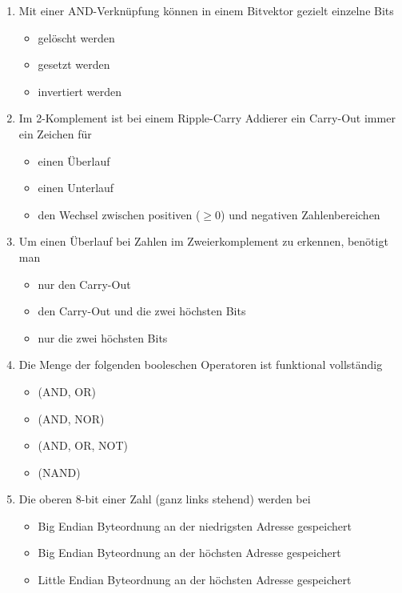 \documentclass{exercisesheet}
\begin{document}
\begin{enumerate}
\begin{itemize}
        \end{itemize}
      \item Mit einer AND-Verknüpfung können in einem Bitvektor gezielt einzelne Bits
        \begin{itemize}
          \item gelöscht werden \checkmark
          \item gesetzt werden
          \item invertiert werden
        \end{itemize}
      \item Im 2-Komplement ist bei einem Ripple-Carry Addierer ein Carry-Out immer ein Zeichen für
        \begin{itemize}
          \item einen Überlauf \checkmark
          \item einen Unterlauf
          \item den Wechsel zwischen positiven ($\geq 0$) und negativen Zahlenbereichen
        \end{itemize}
      \item Um einen Überlauf bei Zahlen im Zweierkomplement zu erkennen, benötigt man
        \begin{itemize}
          \item nur den Carry-Out
          \item den Carry-Out und die zwei höchsten Bits \checkmark
          \item nur die zwei höchsten Bits
        \end{itemize}
      \item Die Menge der folgenden booleschen Operatoren ist funktional vollständig
        \begin{itemize}
          \item (AND, OR) \checkmark
          \item (AND, NOR) \checkmark
          \item (AND, OR, NOT) \checkmark
          \item (NAND)
        \end{itemize}
      \item Die oberen 8-bit einer Zahl (ganz links stehend) werden bei
        \begin{itemize}
          \item Big Endian Byteordnung an der niedrigsten Adresse gespeichert \checkmark
          \item Big Endian Byteordnung an der höchsten Adresse gespeichert
          \item Little Endian Byteordnung an der höchsten Adresse gespeichert \checkmark

\end{itemize}
\end{enumerate}
\end{document}
